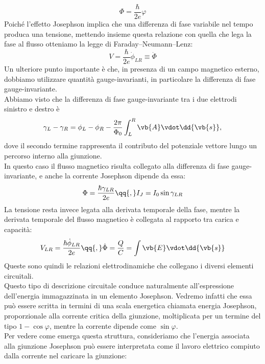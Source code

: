 \begin{equation*}
    \Phi=\frac{\hbar}{2e}\varphi
\end{equation*}
Poiché l'effetto Josephson implica che una differenza di fase variabile nel tempo produca una tensione, mettendo insieme questa relazione con quella che lega la fase al flusso otteniamo la legge di Faraday--Neumann--Lenz:
\begin{equation*}
    V = \frac{\hbar}{2e}\dot{\phi}_{LR} \equiv \dot{\Phi}
\end{equation*}
Un ulteriore punto importante è che, in presenza di un campo magnetico esterno, dobbiamo utilizzare quantità gauge-invarianti, in particolare la differenza di fase gauge-invariante.\\
Abbiamo visto che la differenza di fase gauge-invariante tra i due elettrodi sinistro e destro è
\begin{equation*}
    \gamma_L-\gamma_R
    =
    \phi_L-\phi_R
    -
    \frac{2\pi}{\Phi_0}
    \int_L^R
    \vb{A}\vdot\dd{\vb{s}},
\end{equation*}
dove il secondo termine rappresenta il contributo del potenziale vettore lungo un percorso interno alla giunzione.\\
In questo caso il flusso magnetico risulta collegato alla differenza di fase gauge-invariante, e anche la corrente Josephson dipende da essa:
\begin{equation*}
    \Phi
    =
    \frac{\hbar\gamma_{LR}}{2e}
    \qq{,}
    I_J
    =
    I_0 \sin{\gamma_{LR}}
\end{equation*}
La tensione resta invece legata alla derivata temporale della fase, mentre la derivata temporale del flusso magnetico è collegata al rapporto tra carica e capacità:
\begin{equation*}
    V_{LR}
    =
    \frac{\hbar\dot{\phi}_{LR}}{2e}
    \qq{,}
    \dot{\Phi}
    =
    \frac{Q}{C}
    =
    \int
    \vb{E}\vdot\dd{\vb{s}}
\end{equation*}
Queste sono quindi le relazioni elettrodinamiche che collegano i diversi elementi circuitali.\\
Questo tipo di descrizione circuitale conduce naturalmente all'espressione dell'energia immagazzinata in un elemento Josephson. Vedremo infatti che essa può essere scritta in termini di una scala energetica chiamata energia Josephson, proporzionale alla corrente critica della giunzione, moltiplicata per un termine del tipo $1-\cos{\varphi}$, mentre la corrente dipende come $\sin{\varphi}$.\\
Per vedere come emerga questa struttura, consideriamo che l'energia associata alla giunzione Josephson può essere interpretata come il lavoro elettrico compiuto dalla corrente nel caricare la giunzione:
